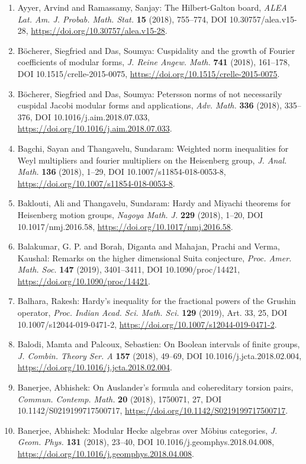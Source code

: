 \begin{enumerate}
\item Ayyer, Arvind and Ramassamy, Sanjay: The {H}ilbert-{G}alton board, \emph{ALEA Lat. Am. J. Probab. Math. Stat.} {\bf 15} (2018), 755--774, DOI 10.30757/alea.v15-28, \url{https://doi.org/10.30757/alea.v15-28}.
\item B\"{o}cherer, Siegfried and Das, Soumya: Cuspidality and the growth of {F}ourier coefficients of
modular forms, \emph{J. Reine Angew. Math.} {\bf 741} (2018), 161--178, DOI 10.1515/crelle-2015-0075, \url{https://doi.org/10.1515/crelle-2015-0075}.
\item B\"{o}cherer, Siegfried and Das, Soumya: Petersson norms of not necessarily cuspidal {J}acobi modular
forms and applications, \emph{Adv. Math.} {\bf 336} (2018), 335--376, DOI 10.1016/j.aim.2018.07.033, \url{https://doi.org/10.1016/j.aim.2018.07.033}.
\item Bagchi, Sayan and Thangavelu, Sundaram: Weighted norm inequalities for {W}eyl multipliers and fourier
multipliers on the {H}eisenberg group, \emph{J. Anal. Math.} {\bf 136} (2018), 1--29, DOI 10.1007/s11854-018-0053-8, \url{https://doi.org/10.1007/s11854-018-0053-8}.
\item Baklouti, Ali and Thangavelu, Sundaram: Hardy and {M}iyachi theorems for {H}eisenberg motion groups, \emph{Nagoya Math. J.} {\bf 229} (2018), 1--20, DOI 10.1017/nmj.2016.58, \url{https://doi.org/10.1017/nmj.2016.58}.
\item Balakumar, G. P. and Borah, Diganta and Mahajan, Prachi and
Verma, Kaushal: Remarks on the higher dimensional {S}uita conjecture, \emph{Proc. Amer. Math. Soc.} {\bf 147} (2019), 3401--3411, DOI 10.1090/proc/14421, \url{https://doi.org/10.1090/proc/14421}.
\item Balhara, Rakesh: Hardy's inequality for the fractional powers of the {G}rushin
operator, \emph{Proc. Indian Acad. Sci. Math. Sci.} {\bf 129} (2019), Art. 33, 25, DOI 10.1007/s12044-019-0471-2, \url{https://doi.org/10.1007/s12044-019-0471-2}.
\item Balodi, Mamta and Palcoux, Sebastien: On {B}oolean intervals of finite groups, \emph{J. Combin. Theory Ser. A} {\bf 157} (2018), 49--69, DOI 10.1016/j.jcta.2018.02.004, \url{https://doi.org/10.1016/j.jcta.2018.02.004}.
\item Banerjee, Abhishek: On {A}uslander's formula and cohereditary torsion pairs, \emph{Commun. Contemp. Math.} {\bf 20} (2018), 1750071, 27, DOI 10.1142/S0219199717500717, \url{https://doi.org/10.1142/S0219199717500717}.
\item Banerjee, Abhishek: Modular {H}ecke algebras over {M}\"{o}bius categories, \emph{J. Geom. Phys.} {\bf 131} (2018), 23--40, DOI 10.1016/j.geomphys.2018.04.008, \url{https://doi.org/10.1016/j.geomphys.2018.04.008}.

\end{enumerate}
